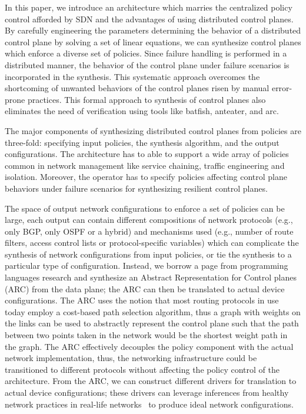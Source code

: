 
In this paper, we introduce an architecture which marries the centralized
policy control afforded by SDN and the advantages of using
distributed control planes. 
By carefully engineering the parameters determining the
behavior of a distributed control plane by solving a set
of linear equations, we can synthesize control planes which
enforce a diverse set of policies. 
Since failure handling is 
performed in a distributed manner, the behavior of the control
plane under failure scenarios is incorporated in the synthesis. 
This systematic approach overcomes the shortcoming of unwanted
behaviors of the control planes risen by manual error-prone
practices. This
formal approach to synthesis of control planes also eliminates the need of 
verification using tools like batfish, anteater, and arc. 

The major components of synthesizing distributed control planes from 
policies are three-fold: specifying input policies, the synthesis 
algorithm, and the output configurations. The architecture has to able to
support a wide array of policies common in network management like service
chaining, traffic engineering and isolation. Moreover, the operator 
has to specify policies affecting control plane behaviors under failure 
scenarios for synthesizing resilient control planes. 

The space of output network configurations to enforce a set of policies
can be large, each output can contain different compositions of 
network protocols (e.g., only BGP, only OSPF or a hybrid) and
mechanisms used (e.g., number of route filters, access control lists
or protocol-specific variables) which can complicate the synthesis of
network configurations from
input policies, or tie the synthesis to a particular type of configuration. 
Instead, we borrow a page from programming languages
research and
synthesize an Abstract Representation for Control planes (ARC) from 
the data plane; the ARC can then be translated to actual device configurations.
The ARC uses the notion that most routing protocols in use 
today employ a cost-based path selection algorithm, thus a graph with
weights on the links can be used to abstractly represent the control plane such that 
the path between two points taken in the network would be 
the shortest weight path in the graph. 
The ARC effectively decouples the policy component with the 
actual network implementation, thus, the networking infrastructure could be
transitioned to different protocols without affecting the policy 
control of the architecture. From the ARC, we can construct different
drivers for translation to actual device configurations; these drivers
can leverage inferences from healthy network practices in 
real-life networks~\cite{mpa-imc15} to produce ideal network configurations.

